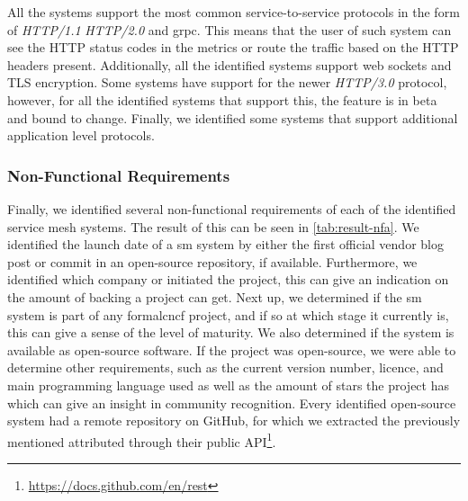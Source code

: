 All the systems support the most common service-to-service protocols in the form of \textit{HTTP/1.1} \textit{HTTP/2.0} and \gls{grpc}. This means that the user of such system can see the HTTP status codes in the metrics or route the traffic based on the HTTP headers present. Additionally, all the identified systems support web sockets and TLS encryption. Some systems have support for the newer \textit{HTTP/3.0} protocol, however, for all the identified systems that support this, the feature is in beta and bound to change. Finally, we identified some systems that support additional application level protocols. 



\subsubsection{Non-Functional Requirements}
\label{sec:survey:results:comparison:nfr}



Finally, we identified several non-functional requirements of each of the identified service mesh systems. The result of this can be seen in \cref{tab:result-nfa}. We identified the launch date of a \gls{sm} system by either the first official vendor blog post or commit in an open-source repository, if available. Furthermore, we identified which company or initiated the project, this can give an indication on the amount of backing a project can get. Next up, we determined if the \gls{sm} system is part of any formal\gls{cncf} project, and if so at which stage it currently is, this can give a sense of the level of maturity. We also determined if the system is available as open-source software. If the project was open-source, we were able to determine other requirements, such as the current version number, licence, and main programming language used as well as the amount of stars the project has which can give an insight in community recognition. Every identified open-source system had a remote repository on GitHub, for which we extracted the previously mentioned attributed through their public API\footnote{\url{https://docs.github.com/en/rest}}.

